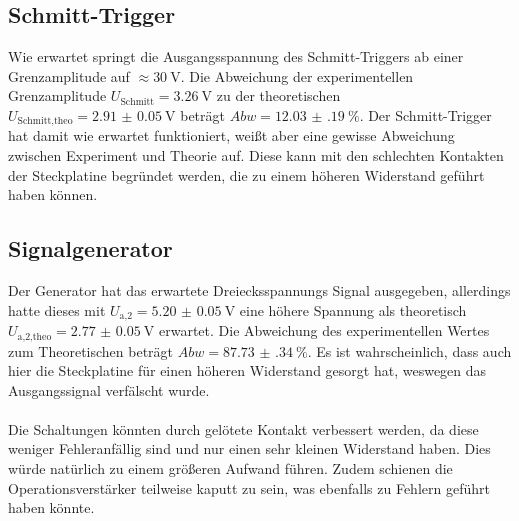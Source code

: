 \subsection{Schmitt-Trigger}
Wie erwartet springt die Ausgangsspannung des Schmitt-Triggers ab einer Grenzamplitude auf $\approx \SI{30}{\V}$.
Die Abweichung der experimentellen Grenzamplitude $U_\text{Schmitt} = \SI{3.26}{\V}$ zu der theoretischen $U_\text{Schmitt,theo} = \SI{2.91(5)}{\V}$ beträgt $Abw = \SI{12.03(19)}{}\%$.
Der Schmitt-Trigger hat damit wie erwartet funktioniert, weißt aber eine gewisse Abweichung zwischen Experiment und Theorie auf.
Diese kann mit den schlechten Kontakten der Steckplatine begründet werden, die zu einem höheren Widerstand geführt haben können.
\subsection{Signalgenerator}
Der Generator hat das erwartete Dreiecksspannungs Signal ausgegeben, allerdings hatte dieses mit $U_\text{a,2} = \SI{5.20(5)}{\V}$ eine höhere Spannung als theoretisch ${U_\text{a,2,theo} = \SI{2.77(5)}{\V}}$ erwartet.
Die Abweichung des experimentellen Wertes zum Theoretischen beträgt $Abw = \SI{87.73(34)}{}\%$.
Es ist wahrscheinlich, dass auch hier die Steckplatine für einen höheren Widerstand gesorgt hat, weswegen das Ausgangssignal verfälscht wurde.
\\\\
Die Schaltungen könnten durch gelötete Kontakt verbessert werden, da diese weniger Fehleranfällig sind und nur einen sehr kleinen Widerstand haben.
Dies würde natürlich zu einem größeren Aufwand führen.
Zudem schienen die Operationsverstärker teilweise kaputt zu sein, was ebenfalls zu Fehlern geführt haben könnte.
